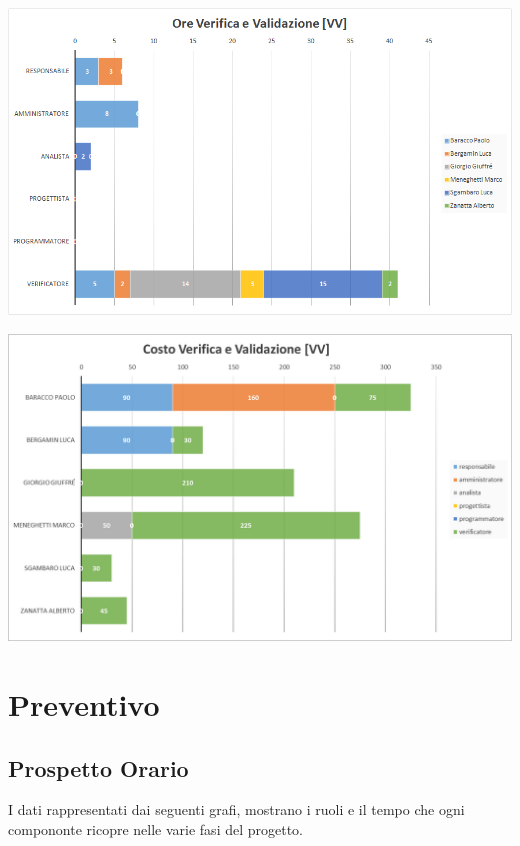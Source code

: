	{\includegraphics[width=15cm]{img/orevv2.png}\par}

	{\includegraphics[width=15cm]{img/costovv.png}\par}


\newpage \section{Preventivo} \label{sec:preventivo}
	\subsection{Prospetto Orario}
I dati rappresentati dai seguenti grafi, mostrano i ruoli e il tempo che ogni compononte ricopre nelle varie fasi del progetto.

